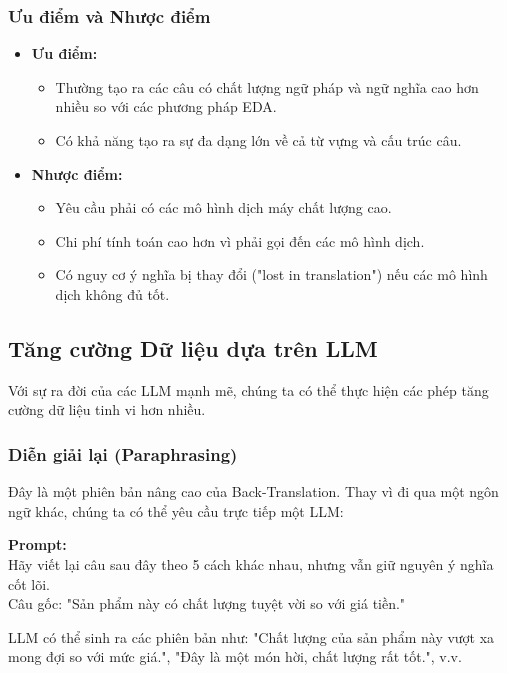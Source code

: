 \subsubsection{Ưu điểm và Nhược điểm}
\begin{itemize}
    \item \textbf{Ưu điểm:}
        \begin{itemize}
            \item Thường tạo ra các câu có chất lượng ngữ pháp và ngữ nghĩa cao hơn nhiều so với các phương pháp EDA.
            \item Có khả năng tạo ra sự đa dạng lớn về cả từ vựng và cấu trúc câu.
        \end{itemize}
    \item \textbf{Nhược điểm:}
        \begin{itemize}
            \item Yêu cầu phải có các mô hình dịch máy chất lượng cao.
            \item Chi phí tính toán cao hơn vì phải gọi đến các mô hình dịch.
            \item Có nguy cơ ý nghĩa bị thay đổi ("lost in translation") nếu các mô hình dịch không đủ tốt.
        \end{itemize}
\end{itemize}

\subsection{Tăng cường Dữ liệu dựa trên LLM}
\label{ssec:llm_based_augmentation}
Với sự ra đời của các LLM mạnh mẽ, chúng ta có thể thực hiện các phép tăng cường dữ liệu tinh vi hơn nhiều.

\subsubsection{Diễn giải lại (Paraphrasing)}
Đây là một phiên bản nâng cao của Back-Translation. Thay vì đi qua một ngôn ngữ khác, chúng ta có thể yêu cầu trực tiếp một LLM:
\begin{tcolorbox}[colback=gray!5!white, colframe=gray!50!black, sharp corners]
\textbf{Prompt:} \\
Hãy viết lại câu sau đây theo 5 cách khác nhau, nhưng vẫn giữ nguyên ý nghĩa cốt lõi. \\
Câu gốc: "Sản phẩm này có chất lượng tuyệt vời so với giá tiền."
\end{tcolorbox}
LLM có thể sinh ra các phiên bản như: "Chất lượng của sản phẩm này vượt xa mong đợi so với mức giá.", "Đây là một món hời, chất lượng rất tốt.", v.v.

